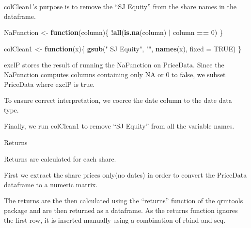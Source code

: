 \documentclass[]{article}
\newenvironment{Shaded}{\begin{snugshade}}{\end{snugshade}}
\newcommand{\KeywordTok}[1]{\textcolor[rgb]{0.13,0.29,0.53}{\textbf{#1}}}
\newcommand{\DataTypeTok}[1]{\textcolor[rgb]{0.13,0.29,0.53}{#1}}
\newcommand{\DecValTok}[1]{\textcolor[rgb]{0.00,0.00,0.81}{#1}}
\newcommand{\StringTok}[1]{\textcolor[rgb]{0.31,0.60,0.02}{#1}}
\newcommand{\OtherTok}[1]{\textcolor[rgb]{0.56,0.35,0.01}{#1}}
\newcommand{\ControlFlowTok}[1]{\textcolor[rgb]{0.13,0.29,0.53}{\textbf{#1}}}
\newcommand{\OperatorTok}[1]{\textcolor[rgb]{0.81,0.36,0.00}{\textbf{#1}}}
\newcommand{\NormalTok}[1]{#1}
\begin{document}
colClean1's purpose is to remove the ``SJ Equity'' from the share names
in the dataframe.

\begin{Shaded}
\begin{Highlighting}[]
\NormalTok{NaFunction <-}\StringTok{  }\ControlFlowTok{function}\NormalTok{(column)\{}
  \OperatorTok{!}\KeywordTok{all}\NormalTok{(}\KeywordTok{is.na}\NormalTok{(column) }\OperatorTok{|}\StringTok{ }\NormalTok{column }\OperatorTok{==}\StringTok{ }\DecValTok{0}\NormalTok{)}
\NormalTok{\}}


\NormalTok{colClean1 <-}\StringTok{ }\ControlFlowTok{function}\NormalTok{(x)\{}
  \KeywordTok{gsub}\NormalTok{(}\StringTok{" SJ Equity"}\NormalTok{, }\StringTok{""}\NormalTok{, }\KeywordTok{names}\NormalTok{(x), }\DataTypeTok{fixed =} \OtherTok{TRUE}\NormalTok{)}
\NormalTok{\}}
\end{Highlighting}
\end{Shaded}

exclP stores the result of running the NaFunction on PriceData. Since
the NaFunction computes columns containing only NA or 0 to false, we
subset PriceData where exclP is true.

To ensure correct interpretation, we coerce the date column to the date
data type.

Finally, we run colClean1 to remove ``SJ Equity'' from all the variable
names.

\begin{Shaded}
\end{Shaded}

Returns

Returns are calculated for each share.

First we extract the share prices only(no dates) in order to convert the
PriceData dataframe to a numeric matrix.

The returns are the then calculated using the ``returns'' function of
the qrmtools package and are then returned as a dataframe. As the
returns function ignores the first row, it is inserted manually using a
combination of rbind and seq.
\end{document}
